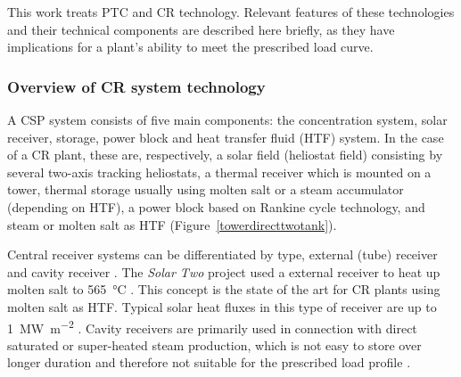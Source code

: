 This work treats PTC and CR technology. Relevant features of these technologies and their technical components are described here briefly, as they have implications for a plant's ability to meet the prescribed load curve. 

\subsubsection{Overview of CR system technology}

A CSP system consists of five main components: the concentration system, solar receiver, storage, power block and heat transfer fluid (HTF) system. In the case of a CR plant, these are, respectively, a solar field (heliostat field) consisting by several two-axis tracking heliostats, a thermal receiver which is mounted on a tower, thermal storage usually using molten salt or a steam accumulator (depending on HTF), a power block based on Rankine cycle technology, and steam or molten salt as HTF (Figure~\ref{towerdirecttwotank}).


Central receiver systems can be differentiated by type, external (tube) receiver and cavity receiver \cite{Hoffschmidt2014}. The \emph{Solar Two} project used a external receiver to heat up molten salt to \SI{565}{\celsius} \cite{Reilly2001}. This concept is the state of the art for CR plants using molten salt as HTF. Typical solar heat fluxes in this type of receiver are up to \SI{1}{\mega\watt\per\square\metre} \cite{Pitz-Paal.2013}. Cavity receivers are primarily used in connection with direct saturated or super-heated steam production, which is not easy to store over longer duration and therefore not suitable for the prescribed load profile \cite{Hoffschmidt2014,Steinmann2015}.


